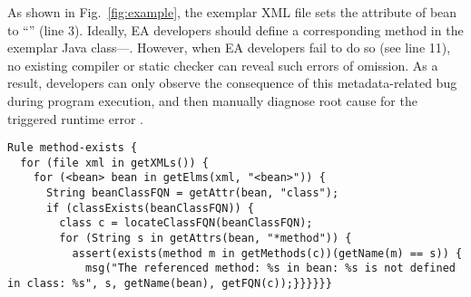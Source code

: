 \begin{comment}
\begin{figure}
   \begin{minipage}{.5\linewidth}
       
   \end{minipage}
   \hfill
   \begin{minipage}{.49\linewidth}
       
   \end{minipage}
\end{figure}

\vspace{-1em}
\begin{lstlisting}[label={lst:example},caption=An exemplar XML file and related Java code]
(*\bf Beans.xml:*)
<?xml version="1.0" encoding="UTF-8"?>
<beans xmlns="http://www.springframework.org/schema/bean"... >
  <bean id = "b" class = "C">
    <property name = "foo" value = "Hello!"/>
    <property name = "bar" value = "Bye!"/>
  </bean>  
</beans>

(*\bf C.java:*)
public class C {
  private String foo;
  private String bar;
  // this setter method can set the "foo"-property value for bean "b" at runtime
  public void setFoo(String v) { this.foo = v; }
  // (*\bf a setter method corresponding to the "bar" field is missing*)
}
\end{lstlisting}
\end{comment}

As shown in Fig.~\ref{fig:example}, the exemplar XML file sets the attribute  of bean  to ``'' (line 3). Ideally, EA developers should define a corresponding method in the exemplar Java class---. 
However, when EA developers fail to do so (see line 11), no existing compiler or static checker can reveal such errors of omission. 
As a result, developers can only observe the consequence of this metadata-related bug during program execution, and then manually diagnose root cause for the triggered runtime error .

\vspace{-1em}
\begin{lstlisting}[label={lst:example-rsl},caption={An RSL specification {for detecting} missing methods}]
Rule method-exists {
  for (file xml in getXMLs()) {
    for (<bean> bean in getElms(xml, "<bean>")) {
      String beanClassFQN = getAttr(bean, "class");
      if (classExists(beanClassFQN)) {
        class c = locateClassFQN(beanClassFQN);
        for (String s in getAttrs(bean, "*method")) {
          assert(exists(method m in getMethods(c))(getName(m) == s)) {
            msg("The referenced method: %s in bean: %s is not defined in class: %s", s, getName(bean), getFQN(c));}}}}}} 
\end{lstlisting}

